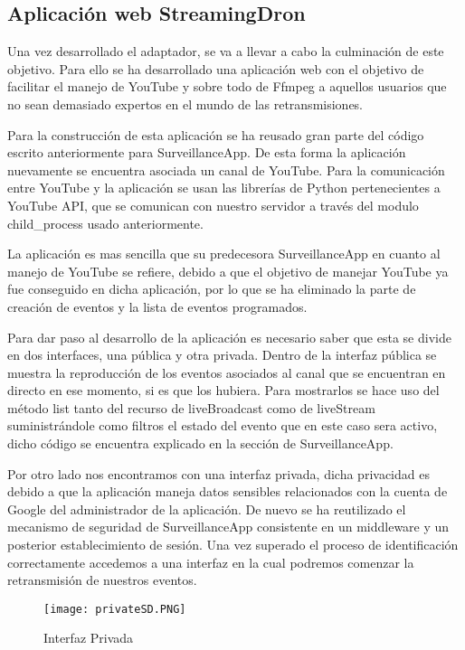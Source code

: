 \subsection{Aplicación web StreamingDron}

Una vez desarrollado el adaptador, se va a llevar a cabo la culminación de este objetivo. Para ello se ha desarrollado una aplicación web con el objetivo de facilitar el manejo de YouTube y sobre todo de Ffmpeg a aquellos usuarios que no sean demasiado expertos en el mundo de las retransmisiones.

Para la construcción de esta aplicación se ha reusado gran parte del código escrito anteriormente para SurveillanceApp. De esta forma la aplicación nuevamente se encuentra asociada un canal de YouTube. Para la comunicación entre YouTube y la aplicación se usan las librerías de Python pertenecientes a YouTube API, que se comunican con nuestro servidor a través del modulo child\_process usado anteriormente.

La aplicación es mas sencilla que su predecesora SurveillanceApp en cuanto al manejo de YouTube se refiere, debido a que el objetivo de manejar YouTube ya fue conseguido en dicha aplicación, por lo que se ha eliminado la parte de creación de eventos y la lista de eventos programados.

Para dar paso al desarrollo de la aplicación es necesario saber que esta se divide en dos interfaces, una pública y otra privada. Dentro de la interfaz pública se muestra la reproducción de los eventos asociados al canal que se encuentran en directo en ese momento, si es que los hubiera. Para mostrarlos se hace uso del método list tanto del recurso de liveBroadcast como de liveStream suministrándole como filtros el estado del evento que en este caso sera activo, dicho código se encuentra explicado en la sección de SurveillanceApp.

Por otro lado nos encontramos con una interfaz privada, dicha privacidad es debido a que la aplicación maneja datos sensibles relacionados con la cuenta de Google del administrador de la aplicación. De nuevo se ha reutilizado el mecanismo de seguridad de SurveillanceApp consistente en un middleware y un posterior establecimiento de sesión. Una vez superado el proceso de identificación correctamente accedemos a una interfaz en la cual podremos comenzar la retransmisión de nuestros eventos.

 
    \begin{figure}[H]
        \centering
        \texttt{[image: privateSD.PNG]}
        \caption{Interfaz Privada}
    \end{figure}


